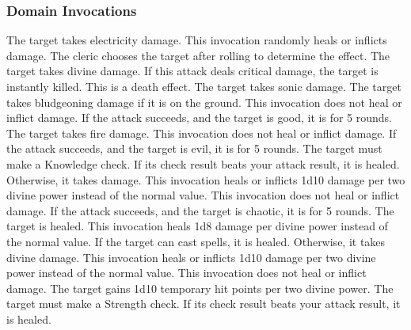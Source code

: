         \subsubsection{Domain Invocations}\label{Domain Invocations}

            The target takes electricity damage.
            This invocation randomly heals or inflicts damage.
            The cleric chooses the target after rolling to determine the effect.
            The target takes divine damage.
            If this attack deals critical damage, the target is instantly killed.
            This is a death effect.
            The target takes sonic damage.
            The target takes bludgeoning damage if it is on the ground.
            This invocation does not heal or inflict damage.
            If the attack succeeds, and the target is good, it is \staggered for 5 rounds.
            The target takes fire damage.
            This invocation does not heal or inflict damage.
            If the attack succeeds, and the target is evil, it is \dazed for 5 rounds.
            The target must make a Knowledge check.
            If its check result beats your attack result, it is healed.
            Otherwise, it takes damage.
            This invocation heals or inflicts 1d10 damage per two divine power instead of the normal value.
            This invocation does not heal or inflict damage.
            If the attack succeeds, and the target is chaotic, it is \immobilized for 5 rounds.
            The target is healed.
            This invocation heals 1d8 damage per divine power instead of the normal value.
            If the target can cast spells, it is healed.
            Otherwise, it takes divine damage.
            This invocation heals or inflicts 1d10 damage per two divine power instead of the normal value.
            This invocation does not heal or inflict damage.
            The target gains 1d10 temporary hit points per two divine power.
            The target must make a Strength check.
            If its check result beats your attack result, it is healed.

